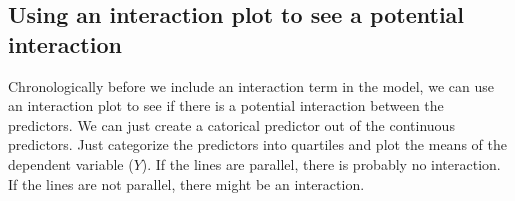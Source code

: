 \documentclass[
]{book}
\newenvironment{Shaded}{\begin{snugshade}}{\end{snugshade}}
\newcommand{\AttributeTok}[1]{\textcolor[rgb]{0.13,0.29,0.53}{#1}}
\newcommand{\CommentTok}[1]{\textcolor[rgb]{0.56,0.35,0.01}{\textit{#1}}}
\newcommand{\ConstantTok}[1]{\textcolor[rgb]{0.56,0.35,0.01}{#1}}
\newcommand{\DecValTok}[1]{\textcolor[rgb]{0.00,0.00,0.81}{#1}}
\newcommand{\FloatTok}[1]{\textcolor[rgb]{0.00,0.00,0.81}{#1}}
\newcommand{\FunctionTok}[1]{\textcolor[rgb]{0.13,0.29,0.53}{\textbf{#1}}}
\newcommand{\NormalTok}[1]{#1}
\newcommand{\OtherTok}[1]{\textcolor[rgb]{0.56,0.35,0.01}{#1}}
\newcommand{\SpecialCharTok}[1]{\textcolor[rgb]{0.81,0.36,0.00}{\textbf{#1}}}
\newcommand{\StringTok}[1]{\textcolor[rgb]{0.31,0.60,0.02}{#1}}
\begin{document}
\subsection{Using an interaction plot to see a potential interaction}\label{interaction_plot}

Chronologically before we include an interaction term in the model, we can use an interaction plot
to see if there is a potential interaction between the predictors.
We can just create a catorical predictor out of the continuous predictors.
Just categorize the predictors into quartiles and plot the means of the dependent variable (\(Y\)).
If the lines are parallel, there is probably no interaction. If the lines are not parallel,
there might be an interaction.

\begin{Shaded}
\end{Shaded}
\end{document}
